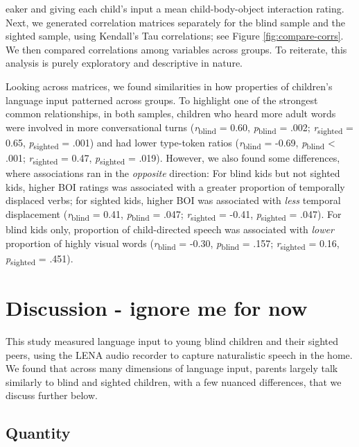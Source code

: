 \documentclass[
  man,floatsintext]{apa6}
\begin{document}
eaker and giving each child's input a mean child-body-object interaction rating. Next, we generated correlation matrices separately for the blind sample and the sighted sample, using Kendall's Tau correlations; see Figure \ref{fig:compare-corrs}. We then compared correlations among variables across groups. To reiterate, this analysis is purely exploratory and descriptive in nature.

Looking across matrices, we found similarities in how properties of children's language input patterned across groups. To highlight one of the strongest common relationships, in both samples, children who heard more adult words were involved in more conversational turns (\emph{r}\textsubscript{blind} = 0.60, \emph{p}\textsubscript{blind} = .002; \emph{r}\textsubscript{sighted} = 0.65, \emph{p}\textsubscript{sighted} = .001) and had lower type-token ratios (\emph{r}\textsubscript{blind} = -0.69, \emph{p}\textsubscript{blind} \textless{} .001; \emph{r}\textsubscript{sighted} = 0.47, \emph{p}\textsubscript{sighted} = .019). However, we also found some differences, where associations ran in the \emph{opposite} direction: For blind kids but not sighted kids, higher BOI ratings was associated with a greater proportion of temporally displaced verbs; for sighted kids, higher BOI was associated with \emph{less} temporal displacement (\emph{r}\textsubscript{blind} = 0.41, \emph{p}\textsubscript{blind} = .047; \emph{r}\textsubscript{sighted} = -0.41, \emph{p}\textsubscript{sighted} = .047). For blind kids only, proportion of child-directed speech was associated with \emph{lower} proportion of highly visual words (\emph{r}\textsubscript{blind} = -0.30, \emph{p}\textsubscript{blind} = .157; \emph{r}\textsubscript{sighted} = 0.16, \emph{p}\textsubscript{sighted} = .451).

\hypertarget{discussion---ignore-me-for-now}{%
\section{Discussion - ignore me for now}\label{discussion---ignore-me-for-now}}

This study measured language input to young blind children and their sighted peers, using the LENA audio recorder to capture naturalistic speech in the home. We found that across many dimensions of language input, parents largely talk similarly to blind and sighted children, with a few nuanced differences, that we discuss further below.

\hypertarget{quantity}{%
\subsection{Quantity}\label{quantity}}
\end{document}

